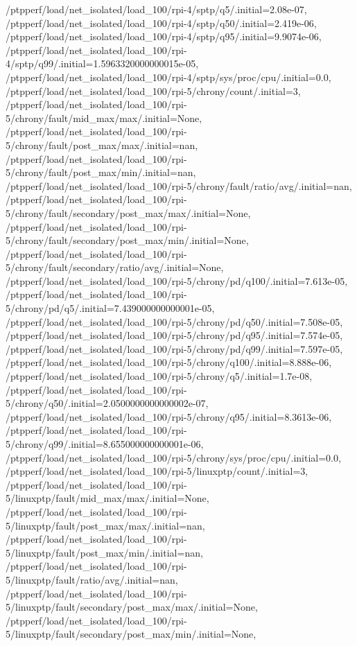 {    /ptpperf/load/net_isolated/load_100/rpi-4/sptp/q5/.initial=2.08e-07,
    /ptpperf/load/net_isolated/load_100/rpi-4/sptp/q50/.initial=2.419e-06,
    /ptpperf/load/net_isolated/load_100/rpi-4/sptp/q95/.initial=9.9074e-06,
    /ptpperf/load/net_isolated/load_100/rpi-4/sptp/q99/.initial=1.5963320000000015e-05,
    /ptpperf/load/net_isolated/load_100/rpi-4/sptp/sys/proc/cpu/.initial=0.0,
    /ptpperf/load/net_isolated/load_100/rpi-5/chrony/count/.initial=3,
    /ptpperf/load/net_isolated/load_100/rpi-5/chrony/fault/mid_max/max/.initial=None,
    /ptpperf/load/net_isolated/load_100/rpi-5/chrony/fault/post_max/max/.initial=nan,
    /ptpperf/load/net_isolated/load_100/rpi-5/chrony/fault/post_max/min/.initial=nan,
    /ptpperf/load/net_isolated/load_100/rpi-5/chrony/fault/ratio/avg/.initial=nan,
    /ptpperf/load/net_isolated/load_100/rpi-5/chrony/fault/secondary/post_max/max/.initial=None,
    /ptpperf/load/net_isolated/load_100/rpi-5/chrony/fault/secondary/post_max/min/.initial=None,
    /ptpperf/load/net_isolated/load_100/rpi-5/chrony/fault/secondary/ratio/avg/.initial=None,
    /ptpperf/load/net_isolated/load_100/rpi-5/chrony/pd/q100/.initial=7.613e-05,
    /ptpperf/load/net_isolated/load_100/rpi-5/chrony/pd/q5/.initial=7.439000000000001e-05,
    /ptpperf/load/net_isolated/load_100/rpi-5/chrony/pd/q50/.initial=7.508e-05,
    /ptpperf/load/net_isolated/load_100/rpi-5/chrony/pd/q95/.initial=7.574e-05,
    /ptpperf/load/net_isolated/load_100/rpi-5/chrony/pd/q99/.initial=7.597e-05,
    /ptpperf/load/net_isolated/load_100/rpi-5/chrony/q100/.initial=8.888e-06,
    /ptpperf/load/net_isolated/load_100/rpi-5/chrony/q5/.initial=1.7e-08,
    /ptpperf/load/net_isolated/load_100/rpi-5/chrony/q50/.initial=2.0500000000000002e-07,
    /ptpperf/load/net_isolated/load_100/rpi-5/chrony/q95/.initial=8.3613e-06,
    /ptpperf/load/net_isolated/load_100/rpi-5/chrony/q99/.initial=8.655000000000001e-06,
    /ptpperf/load/net_isolated/load_100/rpi-5/chrony/sys/proc/cpu/.initial=0.0,
    /ptpperf/load/net_isolated/load_100/rpi-5/linuxptp/count/.initial=3,
    /ptpperf/load/net_isolated/load_100/rpi-5/linuxptp/fault/mid_max/max/.initial=None,
    /ptpperf/load/net_isolated/load_100/rpi-5/linuxptp/fault/post_max/max/.initial=nan,
    /ptpperf/load/net_isolated/load_100/rpi-5/linuxptp/fault/post_max/min/.initial=nan,
    /ptpperf/load/net_isolated/load_100/rpi-5/linuxptp/fault/ratio/avg/.initial=nan,
    /ptpperf/load/net_isolated/load_100/rpi-5/linuxptp/fault/secondary/post_max/max/.initial=None,
    /ptpperf/load/net_isolated/load_100/rpi-5/linuxptp/fault/secondary/post_max/min/.initial=None,
}
